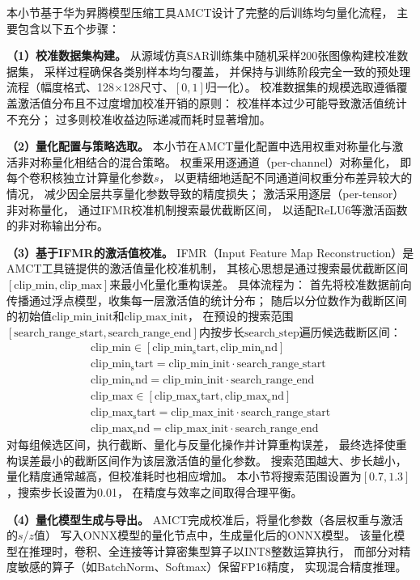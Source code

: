 本小节基于华为昇腾模型压缩工具AMCT设计了完整的后训练均匀量化流程，
主要包含以下五个步骤：

\textbf{（1）校准数据集构建。}
从源域仿真SAR训练集中随机采样200张图像构建校准数据集，
采样过程确保各类别样本均匀覆盖，
并保持与训练阶段完全一致的预处理流程（幅度格式、128$\times$128尺寸、$[0,1]$归一化）。
校准数据集的规模选取遵循覆盖激活值分布且不过度增加校准开销的原则：
校准样本过少可能导致激活值统计不充分；
过多则校准收益边际递减而耗时显著增加。

\textbf{（2）量化配置与策略选取。}
本小节在AMCT量化配置中选用权重对称量化与激活非对称量化相结合的混合策略。
权重采用逐通道（per-channel）对称量化，
即每个卷积核独立计算量化参数$s$，
以更精细地适配不同通道间权重分布差异较大的情况，
减少因全层共享量化参数导致的精度损失；
激活采用逐层（per-tensor）非对称量化，
通过IFMR校准机制搜索最优截断区间，
以适配ReLU6等激活函数的非对称输出分布。

\textbf{（3）基于IFMR的激活值校准。}
IFMR（Input Feature Map Reconstruction）是AMCT工具链提供的激活值量化校准机制，
其核心思想是通过搜索最优截断区间$[\mathrm{clip\_min},\mathrm{clip\_max}]$来最小化量化重构误差。
具体流程为：
首先将校准数据前向传播通过浮点模型，收集每一层激活值的统计分布；
随后以分位数作为截断区间的初始值$\mathrm{clip\_min\_init}$和$\mathrm{clip\_max\_init}$，
在预设的搜索范围$[\mathrm{search\_range\_start},\mathrm{search\_range\_end}]$内按步长$\mathrm{search\_step}$遍历候选截断区间：
\begin{gather}
\mathrm{clip\_min} \in [\mathrm{clip\_min_start},\mathrm{clip\_min_end}] \\
\mathrm{clip\_min_start}=\mathrm{clip\_min\_init}\cdot\mathrm{search\_range\_start}\\
\mathrm{clip\_min_end}=\mathrm{clip\_min\_init}\cdot\mathrm{search\_range\_end} \\
\mathrm{clip\_max} \in [\mathrm{clip\_max_start},\mathrm{clip\_max_end}] \\
\mathrm{clip\_max_start}=\mathrm{clip\_max\_init}\cdot\mathrm{search\_range\_start}\\
\mathrm{clip\_max_end}=\mathrm{clip\_max\_init}\cdot\mathrm{search\_range\_end}
\end{gather}
对每组候选区间，执行截断、量化与反量化操作并计算重构误差，
最终选择使重构误差最小的截断区间作为该层激活值的量化参数。
搜索范围越大、步长越小，量化精度通常越高，但校准耗时也相应增加。
本小节将搜索范围设置为$[0.7, 1.3]$，搜索步长设置为0.01，
在精度与效率之间取得合理平衡。

\textbf{（4）量化模型生成与导出。}
AMCT完成校准后，将量化参数（各层权重与激活的$s$/$z$值）
写入ONNX模型的量化节点中，生成量化后的ONNX模型。
该量化模型在推理时，卷积、全连接等计算密集型算子以INT8整数运算执行，
而部分对精度敏感的算子（如BatchNorm、Softmax）保留FP16精度，
实现混合精度推理。

